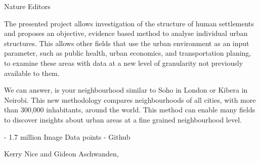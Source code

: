 \documentclass[11pt]{letter} %
\begin{document}
\begin{letter}{Nature Editors
}

The presented project allows investigation of the structure of human settlements and proposes an objective, evidence based method to analyse individual urban structures. This allows other fields that use the urban environment as an input parameter, such as public health, urban economics, and transportation planing, to examine these areas with data at a new level of granularity not previously available to them.

We can answer, is your neighbourhood similar to Soho in London or Kibera in Neirobi. This new methodology compares neighbourhoods of all cities, with more than 300,000 inhabitants, around the world. This method can enable many fields to discover insights about urban areas at a fine grained neighbourhood level. 


- 1.7 million Image Data points
- Github


\closing{Kerry Nice and Gideon Aschwanden,}




\end{letter}
\end{document}
